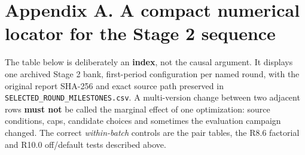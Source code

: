 \documentclass[a4paper,10pt]{article}
\theoremstyle{definition}
\theoremstyle{remark}
\begin{document}
\section{Appendix A. A compact numerical locator for the Stage 2 sequence}\label{appendix-a.-a-compact-numerical-locator-for-the-stage-2-sequence}

The table below is deliberately an \textbf{index}, not the causal argument. It displays one archived Stage 2 bank, first-period configuration per named round, with the original report SHA-256 and exact source path preserved in \texttt{SELECTED\_ROUND\_MILESTONES.csv}. A multi-version change between two adjacent rows \textbf{must not} be called the marginal effect of one optimization: source conditions, caps, candidate choices and sometimes the evaluation campaign changed. The correct \emph{within-batch} controls are the pair tables, the R8.6 factorial and R10.0 off/default tests described above.
\end{document}
